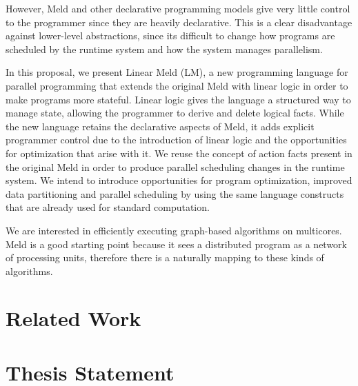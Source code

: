 However, Meld and other declarative programming models give very little control to the programmer since they are heavily declarative.
This is a clear disadvantage against lower-level abstractions, since its difficult to change how programs are scheduled by
the runtime system and how the system manages parallelism.

In this proposal, we present Linear Meld (LM), a new programming language for parallel programming that extends the
original Meld with linear logic in order to make programs more stateful. Linear logic gives the language a structured
way to manage state, allowing the programmer to derive and delete logical facts.
While the new language retains the declarative aspects of Meld, it adds explicit programmer control
due to the introduction of linear logic and the opportunities for optimization that arise with it.
We reuse the concept of action facts present in the original Meld in order to produce parallel scheduling changes
in the runtime system. We intend to introduce opportunities for program optimization, improved data partitioning and
parallel scheduling by using the same language constructs that are already used for standard computation.

We are interested in efficiently executing graph-based algorithms on multicores. Meld is a good
starting point because it sees a distributed program as a network of processing units, therefore
there is a naturally mapping to these kinds of algorithms.

\section{Related Work}



\section{Thesis Statement}



